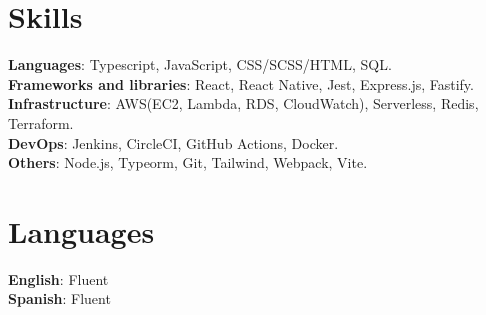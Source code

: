 \documentclass[letterpaper,11pt]{article}
\begin{document}
\begin{minipage}[t]{.78\textwidth}
  \section{Skills}
  \begin{itemize}[leftmargin=0.15in, label={}]
      \small{\item{
      \textbf{Languages}{: Typescript, JavaScript, CSS/SCSS/HTML, SQL.} \\
      \textbf{Frameworks and libraries}{: React, React Native, Jest, Express.js, Fastify.} \\
      \textbf{Infrastructure}{: AWS(EC2, Lambda, RDS, CloudWatch), Serverless, Redis, Terraform.} \\
      \textbf{DevOps}{: Jenkins, CircleCI, GitHub Actions, Docker.} \\
      \textbf{Others}{: Node.js, Typeorm, Git, Tailwind, Webpack, Vite.} \\
      }}
  \end{itemize}
\end{minipage}\hspace{.02\textwidth}%
\begin{minipage}[t]{.20\textwidth}
  \section{Languages}
  \begin{itemize}[leftmargin=0.0in, label={}]
      \small{\item{
      \textbf{English}{: Fluent} \\
      \textbf{Spanish}{: Fluent} \\
      }}
  \end{itemize}
\end{minipage}\vspace{-10pt}
\end{document}
